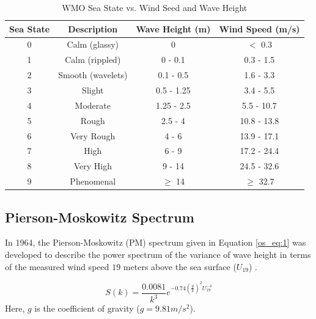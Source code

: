\begin{table}[H]
  \begin{center}
      \renewcommand{\baselinestretch}{1} \small\normalsize
  \begin{quote}
    \caption[WMO Sea State vs. Wind Speed and Wave Height]{WMO Sea State vs. Wind Seed and Wave Height\label{os_tab:0}}
  \end{quote}
  \begin{tabular} {|c | c | c| c|}
    \hline
  \bf{Sea State} & \bf{Descriptio}n & \bf{Wave Height (m)} & \bf{Wind Speed (m/s)}\\ \hline
  0 & Calm (glassy) & 0 & $<$ 0.3 \\ \hline
  1 & Calm (rippled) & 0 - 0.1 & 0.3 - 1.5 \\ \hline
  2 & Smooth (wavelets) & 0.1 - 0.5 & 1.6 - 3.3 \\ \hline
  3 & Slight & 0.5 - 1.25 & 3.4 - 5.5 \\ \hline
  4 & Moderate & 1.25 - 2.5 & 5.5 - 10.7 \\ \hline
  5 & Rough & 2.5 - 4 & 10.8 - 13.8 \\ \hline
  6 & Very Rough & 4 - 6 & 13.9 - 17.1\\ \hline
  7 & High & 6 - 9 & 17.2 - 24.4\\ \hline
  8 & Very High & 9 - 14 & 24.5 - 32.6\\ \hline
  9 & Phenomenal & $\geq$ 14 & $\geq$ 32.7\\ \hline
\end{tabular}
\end{center}
\end{table}
\renewcommand{\baselinestretch}{2} \small\normalsize

\subsection {Pierson-Moskowitz Spectrum}
In 1964, the Pierson-Moskowitz (PM) spectrum given in Equation \ref{os_eq:1} was developed to describe the power spectrum of the variance of wave height in terms of the measured wind speed $19$ meters above the sea surface ($U_{19}$) \cite{michel_sea_spectra}.
 
 \begin{equation}
S(k) = \frac{0.0081}{k^3}e^{-0.74\left(\frac{g}{k}\right)^2U_{19}^{-4}}
\label{os_eq:1}
\end{equation}
 \renewcommand{\baselinestretch}{2} \small\normalsize
Here, $g$ is the coefficient of gravity ($g = 9.81 m/s^2$). 
 
